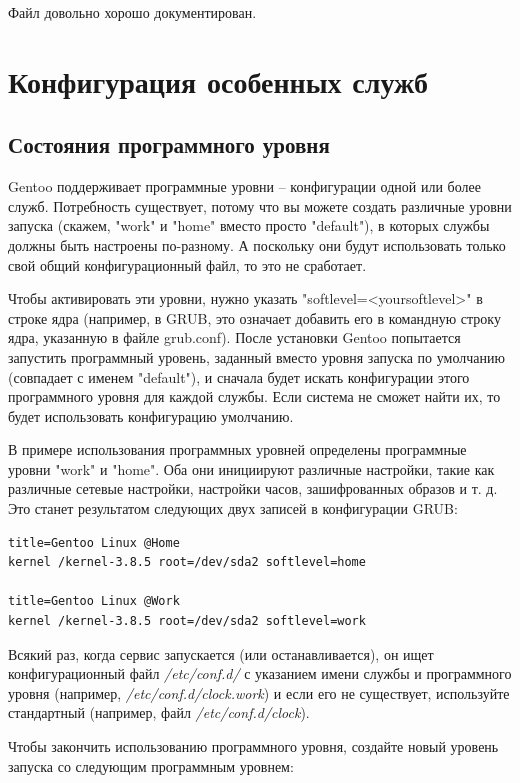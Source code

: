 \documentclass[10pt]{book}
\begin{document}
Файл довольно хорошо документирован.

\section{Конфигурация особенных служб}

\subsection{Состояния программного уровня}
Gentoo поддерживает программные уровни -- конфигурации одной или более служб. Потребность существует, потому что вы можете создать различные уровни запуска (скажем, "work"{} и "home"{} вместо просто "default"{}), в которых службы должны быть настроены по-разному. А поскольку они будут использовать только свой общий конфигурационный файл, то это не сработает.

Чтобы активировать эти уровни, нужно указать "softlevel=<yoursoftlevel>"{} в строке ядра (например, в GRUB, это означает добавить его в командную строку ядра, указанную в файле grub.conf). После установки Gentoo попытается запустить программный уровень, заданный вместо уровня запуска по умолчанию (совпадает с именем "default"{}), и сначала будет искать конфигурации этого программного уровня для каждой службы. Если система не сможет найти их, то будет использовать конфигурацию умолчанию.

В примере использования программных уровней определены программные уровни "work"{} и "home"{}. Оба они инициируют различные настройки, такие как различные сетевые настройки,  настройки часов, зашифрованных образов и т. д. Это станет результатом следующих двух записей в конфигурации GRUB:

\begin{tcolorbox} 
\begin{lstlisting}
title=Gentoo Linux @Home
kernel /kernel-3.8.5 root=/dev/sda2 softlevel=home

title=Gentoo Linux @Work
kernel /kernel-3.8.5 root=/dev/sda2 softlevel=work
\end{lstlisting}
\end{tcolorbox}

Всякий раз, когда сервис запускается (или останавливается), он ищет конфигурационный файл \textit{/etc/conf.d/} с указанием имени службы и программного уровня (например, \textit{/etc/conf.d/clock.work}) и если его не существует, используйте стандартный (например, файл \textit{/etc/conf.d/clock}).

Чтобы закончить использованию программного уровня, создайте новый уровень запуска со следующим программным уровнем:
\end{document}
